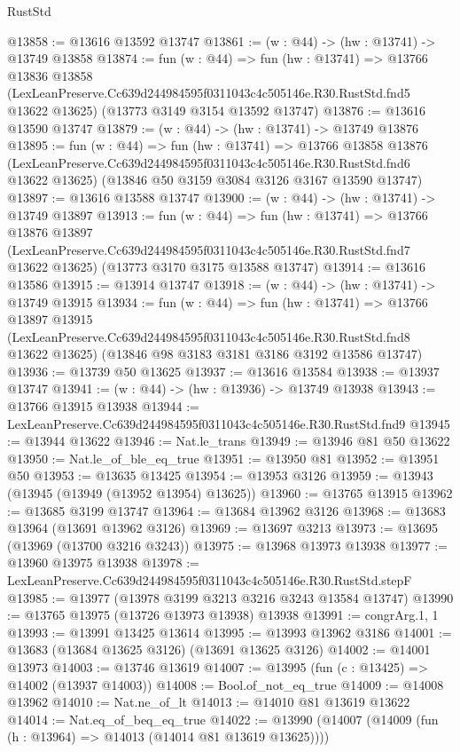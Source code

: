 \begin{lexlean}{RustStd}
\begin{coremodule}
@13858 := @13616 @13592 @13747
@13861 := (w : @44) -> (hw : @13741) -> @13749 @13858
@13874 := fun (w : @44) =>
  fun (hw : @13741) =>
  @13766
    @13836
    @13858
    (LexLeanPreserve.Cc639d244984595f0311043c4c505146e.R30.RustStd.fnd5 @13622 @13625)
    (@13773 @3149 @3154 @13592 @13747)
@13876 := @13616 @13590 @13747
@13879 := (w : @44) -> (hw : @13741) -> @13749 @13876
@13895 := fun (w : @44) =>
  fun (hw : @13741) =>
  @13766
    @13858
    @13876
    (LexLeanPreserve.Cc639d244984595f0311043c4c505146e.R30.RustStd.fnd6 @13622 @13625)
    (@13846 @50 @3159 @3084 @3126 @3167 @13590 @13747)
@13897 := @13616 @13588 @13747
@13900 := (w : @44) -> (hw : @13741) -> @13749 @13897
@13913 := fun (w : @44) =>
  fun (hw : @13741) =>
  @13766
    @13876
    @13897
    (LexLeanPreserve.Cc639d244984595f0311043c4c505146e.R30.RustStd.fnd7 @13622 @13625)
    (@13773 @3170 @3175 @13588 @13747)
@13914 := @13616 @13586
@13915 := @13914 @13747
@13918 := (w : @44) -> (hw : @13741) -> @13749 @13915
@13934 := fun (w : @44) =>
  fun (hw : @13741) =>
  @13766
    @13897
    @13915
    (LexLeanPreserve.Cc639d244984595f0311043c4c505146e.R30.RustStd.fnd8 @13622 @13625)
    (@13846 @98 @3183 @3181 @3186 @3192 @13586 @13747)
@13936 := @13739 @50 @13625
@13937 := @13616 @13584
@13938 := @13937 @13747
@13941 := (w : @44) -> (hw : @13936) -> @13749 @13938
@13943 := @13766 @13915 @13938
@13944 := LexLeanPreserve.Cc639d244984595f0311043c4c505146e.R30.RustStd.fnd9
@13945 := @13944 @13622
@13946 := Nat.le_trans
@13949 := @13946 @81 @50 @13622
@13950 := Nat.le_of_ble_eq_true
@13951 := @13950 @81
@13952 := @13951 @50
@13953 := @13635 @13425
@13954 := @13953 @3126
@13959 := @13943 (@13945 (@13949 (@13952 @13954) @13625))
@13960 := @13765 @13915
@13962 := @13685 @3199 @13747
@13964 := @13684 @13962 @3126
@13968 := @13683 @13964 (@13691 @13962 @3126)
@13969 := @13697 @3213
@13973 := @13695 (@13969 (@13700 @3216 @3243))
@13975 := @13968 @13973 @13938
@13977 := @13960 @13975 @13938
@13978 := LexLeanPreserve.Cc639d244984595f0311043c4c505146e.R30.RustStd.stepF
@13985 := @13977 (@13978 @3199 @3213 @3216 @3243 @13584 @13747)
@13990 := @13765 @13975 (@13726 @13973 @13938) @13938
@13991 := congrArg.{1, 1}
@13993 := @13991 @13425 @13614
@13995 := @13993 @13962 @3186
@14001 := @13683 (@13684 @13625 @3126) (@13691 @13625 @3126)
@14002 := @14001 @13973
@14003 := @13746 @13619
@14007 := @13995 (fun (c : @13425) => @14002 (@13937 @14003))
@14008 := Bool.of_not_eq_true
@14009 := @14008 @13962
@14010 := Nat.ne_of_lt
@14013 := @14010 @81 @13619 @13622
@14014 := Nat.eq_of_beq_eq_true
@14022 := @13990 (@14007 (@14009 (fun (h : @13964) => @14013 (@14014 @81 @13619 @13625))))

\end{coremodule}
\end{lexlean}

